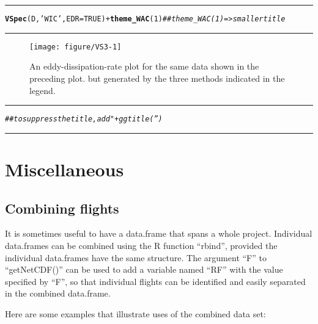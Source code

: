 \documentclass[12pt,english]{report}\usepackage[]{graphicx}\usepackage[]{color}
\makeatletter
\def\maxwidth{ %
  \ifdim\Gin@nat@width>\linewidth
    \linewidth
  \else
    \Gin@nat@width
  \fi
}
\newcommand{\hlnum}[1]{\textcolor[rgb]{0.686,0.059,0.569}{#1}}%
\newcommand{\hlstr}[1]{\textcolor[rgb]{0.192,0.494,0.8}{#1}}%
\newcommand{\hlcom}[1]{\textcolor[rgb]{0.678,0.584,0.686}{\textit{#1}}}%
\newcommand{\hlopt}[1]{\textcolor[rgb]{0,0,0}{#1}}%
\newcommand{\hlstd}[1]{\textcolor[rgb]{0.345,0.345,0.345}{#1}}%
\newcommand{\hlkwc}[1]{\textcolor[rgb]{0.333,0.667,0.333}{#1}}%
\newcommand{\hlkwd}[1]{\textcolor[rgb]{0.737,0.353,0.396}{\textbf{#1}}}%
\newenvironment{kframe}{%
 \def\at@end@of@kframe{}%
 \ifinner\ifhmode%
  \def\at@end@of@kframe{\end{minipage}}%
  \begin{minipage}{\columnwidth}%
 \fi\fi%
 \def\FrameCommand##1{\hskip\@totalleftmargin \hskip-\fboxsep
 \colorbox{shadecolor}{##1}\hskip-\fboxsep
     \hskip-\linewidth \hskip-\@totalleftmargin \hskip\columnwidth}%
 \MakeFramed {\advance\hsize-\width
   \@totalleftmargin\z@ \linewidth\hsize
   \@setminipage}}%
 {\par\unskip\endMakeFramed%
 \at@end@of@kframe}
\newenvironment{knitrout}{}{} %
\renewenvironment{kframe}{\vskip0.1in\hrule}{\hrule\vskip0.1in}
\makeatother
\begin{document}
\begin{knitrout}
\color{fgcolor}\begin{kframe}
\begin{alltt}
\hlkwd{VSpec}\hlstd{(D,} \hlstr{'WIC'}\hlstd{,} \hlkwc{EDR}\hlstd{=}\hlnum{TRUE}\hlstd{)} \hlopt{+} \hlkwd{theme_WAC}\hlstd{(}\hlnum{1}\hlstd{)}  \hlcom{## theme_WAC(1) => smaller title}
\end{alltt}
\end{kframe}\begin{figure}

{\centering \texttt{[image: figure/VS3-1]} 

}

\caption[An eddy-dissipation-rate plot for the same data shown in the preceding plot]{An eddy-dissipation-rate plot for the same data shown in the preceding plot. but generated by the three methods indicated in the legend.}\label{fig:VS3}
\end{figure}

\begin{kframe}\begin{alltt}
\hlcom{## to suppress the title, add "+ ggtitle('')}
\end{alltt}
\end{kframe}
\end{knitrout}

\chapter{Miscellaneous}

\section{Combining flights}

It is sometimes useful to have a data.frame that spans a whole project.
Individual data.frames can be combined using the R function ``rbind'',
provided the individual data.frames have the same structure. The argument
``F'' to ``getNetCDF()'' can be used to add a variable named ``RF''
with the value specified by ``F'', so that individual flights can
be identified and easily separated in the combined data.frame.

Here are some examples that illustrate uses of the combined data set:
\end{document}

